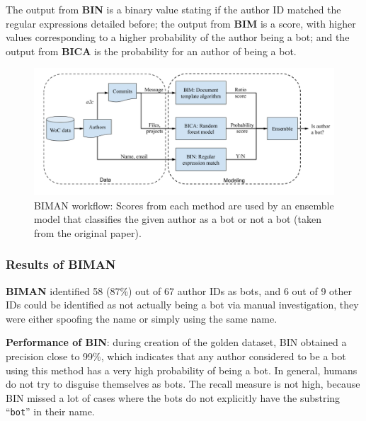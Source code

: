 \documentclass[a4paper, 12pt]{book}
\begin{document}
The output from \textbf{BIN} is a binary value stating if the author ID matched the regular expressions detailed before; the output from \textbf{BIM} is a score, with higher values corresponding to a higher probability of the author being a bot; and the output from \textbf{BICA} is the probability for an author of being a bot.

\begin{figure}
 \centering
  \includegraphics[width=15cm, keepaspectratio]{img/BIMAN-workflow.png}
  \caption{BIMAN workflow: Scores from each method are used by an ensemble model that classifies the given author as a bot or not a bot (taken from the original paper).}
  \label{fig:biman-workflow}
\end{figure}

\subsubsection{Results of BIMAN}
\label{sssec:dey-results-biman}

\textbf{BIMAN} identified 58 (87\%) out of 67 author IDs as bots, and 6 out of 9 other IDs could be identified as not actually being a bot via manual investigation, they were either spoofing
the name or simply using the same name. 

\textbf{Performance of BIN}:  during creation of the golden dataset, BIN obtained a precision close to 99\%, which indicates that any author considered to be a bot using this method has a very high probability of being a bot. In general, humans do not try to disguise themselves as bots. The recall measure is not high, because BIN missed a lot of cases where the bots do not explicitly have the substring ``\texttt{bot}'' in their name.
\end{document}
